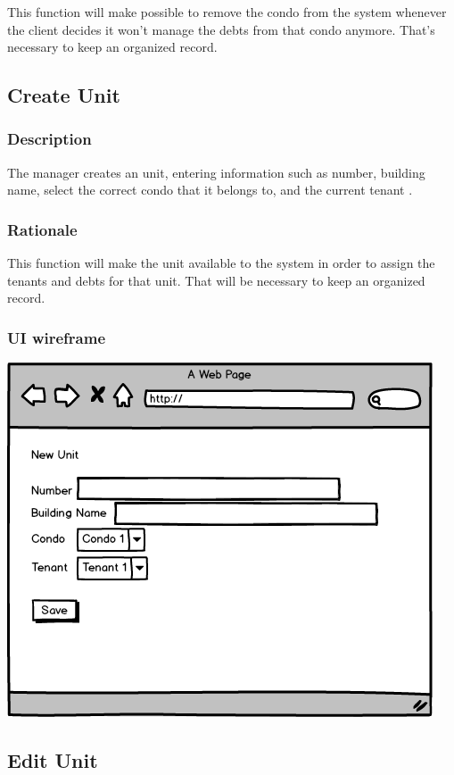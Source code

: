 \documentclass{scrreprt}
\begin{document}
This function will make possible to remove the condo from the system whenever the client decides it won't manage the debts from that condo anymore. That's necessary to keep an organized record.

\subsection{Create Unit}
\subsubsection{Description}

The manager creates an unit, entering information such as number, building name, select the correct condo that it belongs to, and the current tenant .

\subsubsection{Rationale}

This function will make the unit available to the system in order to assign the tenants and debts for that unit. That will be necessary to keep an organized record.

\subsubsection{UI wireframe}
\includegraphics[scale=0.60]{mockups/createunit.png}

\subsection{Edit Unit}
\end{document}
